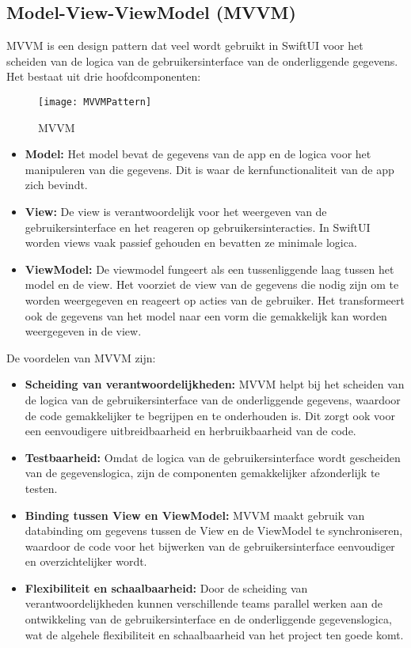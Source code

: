\subsection{Model-View-ViewModel (MVVM)}
\autocite{MediumMVVM} MVVM is een design pattern dat veel wordt gebruikt in SwiftUI voor het scheiden van de logica van de gebruikersinterface van de onderliggende gegevens. Het bestaat uit drie hoofdcomponenten:
\begin{figure}[H]
    \centering
    \texttt{[image: MVVMPattern]} 
    \caption{MVVM \autocite{MVVMImage}}
    \label{fig:mvvm}
\end{figure}
\begin{itemize}
    \item {\textbf{Model:} Het model bevat de gegevens van de app en de logica voor het manipuleren van die gegevens. Dit is waar de kernfunctionaliteit van de app zich bevindt.}
    \item {\textbf{View:} De view is verantwoordelijk voor het weergeven van de gebruikersinterface en het reageren op gebruikersinteracties. In SwiftUI worden views vaak passief gehouden en bevatten ze minimale logica.}
    \item {\textbf{ViewModel:} De viewmodel fungeert als een tussenliggende laag tussen het model en de view. Het voorziet de view van de gegevens die nodig zijn om te worden weergegeven en reageert op acties van de gebruiker. Het transformeert ook de gegevens van het model naar een vorm die gemakkelijk kan worden weergegeven in de view.}
\end{itemize}
De voordelen van MVVM zijn:
\begin{itemize}
    \item {\textbf{Scheiding van verantwoordelijkheden:} MVVM helpt bij het scheiden van de logica van de gebruikersinterface van de onderliggende gegevens, waardoor de code gemakkelijker te begrijpen en te onderhouden is. Dit zorgt ook voor een eenvoudigere uitbreidbaarheid en herbruikbaarheid van de code.}
    \item {\textbf{Testbaarheid:} Omdat de logica van de gebruikersinterface wordt gescheiden van de gegevenslogica, zijn de componenten gemakkelijker afzonderlijk te testen.}
        \item \textbf{Binding tussen View en ViewModel:} MVVM maakt gebruik van databinding om gegevens tussen de View en de ViewModel te synchroniseren, waardoor de code voor het bijwerken van de gebruikersinterface eenvoudiger en overzichtelijker wordt.
    
    \item \textbf{Flexibiliteit en schaalbaarheid:} Door de scheiding van verantwoordelijkheden kunnen verschillende teams parallel werken aan de ontwikkeling van de gebruikersinterface en de onderliggende gegevenslogica, wat de algehele flexibiliteit en schaalbaarheid van het project ten goede komt.
\end{itemize}

